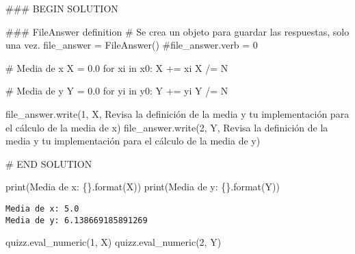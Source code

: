 \documentclass[
  letterpaper,
  DIV=11,
  numbers=noendperiod]{scrreprt}
\newenvironment{Shaded}{\begin{snugshade}}{\end{snugshade}}
\newcommand{\BuiltInTok}[1]{\textcolor[rgb]{0.00,0.23,0.31}{#1}}
\newcommand{\CommentTok}[1]{\textcolor[rgb]{0.37,0.37,0.37}{#1}}
\newcommand{\ControlFlowTok}[1]{\textcolor[rgb]{0.00,0.23,0.31}{#1}}
\newcommand{\FloatTok}[1]{\textcolor[rgb]{0.68,0.00,0.00}{#1}}
\newcommand{\KeywordTok}[1]{\textcolor[rgb]{0.00,0.23,0.31}{#1}}
\newcommand{\NormalTok}[1]{\textcolor[rgb]{0.00,0.23,0.31}{#1}}
\newcommand{\OperatorTok}[1]{\textcolor[rgb]{0.37,0.37,0.37}{#1}}
\newcommand{\RegionMarkerTok}[1]{\textcolor[rgb]{0.00,0.23,0.31}{#1}}
\newcommand{\SpecialCharTok}[1]{\textcolor[rgb]{0.37,0.37,0.37}{#1}}
\newcommand{\StringTok}[1]{\textcolor[rgb]{0.13,0.47,0.30}{#1}}
\begin{document}
\begin{Shaded}
\begin{Highlighting}[]
\CommentTok{\#\#\# }\RegionMarkerTok{BEGIN}\CommentTok{ SOLUTION}

\CommentTok{\#\#\# FileAnswer definition}
\CommentTok{\# Se crea un objeto para guardar las respuestas, solo una vez.}
\NormalTok{file\_answer }\OperatorTok{=}\NormalTok{ FileAnswer() }
\CommentTok{\#file\_answer.verb = 0}

\CommentTok{\# Media de x}
\NormalTok{X }\OperatorTok{=} \FloatTok{0.0}
\ControlFlowTok{for}\NormalTok{ xi }\KeywordTok{in}\NormalTok{ x0:}
\NormalTok{    X }\OperatorTok{+=}\NormalTok{ xi}
\NormalTok{X }\OperatorTok{/=}\NormalTok{ N}

\CommentTok{\# Media de y}
\NormalTok{Y }\OperatorTok{=} \FloatTok{0.0}
\ControlFlowTok{for}\NormalTok{ yi }\KeywordTok{in}\NormalTok{ y0:}
\NormalTok{    Y }\OperatorTok{+=}\NormalTok{ yi}
\NormalTok{Y }\OperatorTok{/=}\NormalTok{ N}

\NormalTok{file\_answer.write(}\StringTok{\textquotesingle{}1\textquotesingle{}}\NormalTok{, X, }\StringTok{\textquotesingle{}Revisa la definición de la media y tu implementación para el cálculo de la media de x\textquotesingle{}}\NormalTok{)}
\NormalTok{file\_answer.write(}\StringTok{\textquotesingle{}2\textquotesingle{}}\NormalTok{, Y, }\StringTok{\textquotesingle{}Revisa la definición de la media y tu implementación para el cálculo de la media de y\textquotesingle{}}\NormalTok{)}

\CommentTok{\# }\RegionMarkerTok{END}\CommentTok{ SOLUTION}

\BuiltInTok{print}\NormalTok{(}\StringTok{\textquotesingle{}Media de x: }\SpecialCharTok{\{\}}\StringTok{\textquotesingle{}}\NormalTok{.}\BuiltInTok{format}\NormalTok{(X))}
\BuiltInTok{print}\NormalTok{(}\StringTok{\textquotesingle{}Media de y: }\SpecialCharTok{\{\}}\StringTok{\textquotesingle{}}\NormalTok{.}\BuiltInTok{format}\NormalTok{(Y))}
\end{Highlighting}
\end{Shaded}

\begin{verbatim}
Media de x: 5.0
Media de y: 6.138669185891269
\end{verbatim}

\begin{Shaded}
\begin{Highlighting}[]
\NormalTok{quizz.eval\_numeric(}\StringTok{\textquotesingle{}1\textquotesingle{}}\NormalTok{, X)}
\NormalTok{quizz.eval\_numeric(}\StringTok{\textquotesingle{}2\textquotesingle{}}\NormalTok{, Y)}
\end{Highlighting}
\end{Shaded}
\end{document}
